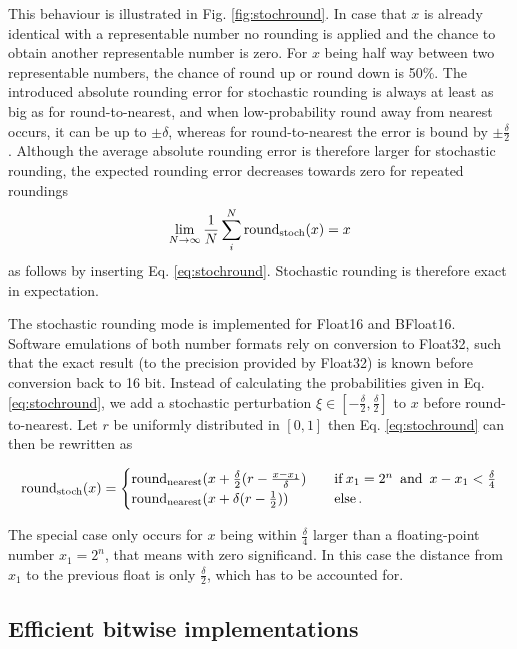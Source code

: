 This behaviour is illustrated in Fig. \ref{fig:stochround}. In case that $x$ is already identical with a representable number no rounding is applied
and the chance to obtain another representable number is zero. For $x$ being half way between two representable numbers, the chance of
round up or round down is 50\%. The introduced absolute rounding error for stochastic rounding is always at least as big as for round-to-nearest,
and when low-probability round away from nearest occurs, it can be up to $\pm \delta$, whereas for round-to-nearest the error is bound by
$\pm \tfrac{\delta}{2}$. Although the average absolute rounding error is therefore larger for stochastic rounding, the expected rounding error
decreases towards zero for repeated roundings
\begin{equation}
\lim_{N\to \infty}\frac{1}{N} \sum_i^N \operatorname{round}_{\operatorname{stoch}}(x) = x
\end{equation}
as follows by inserting Eq. \ref{eq:stochround}. Stochastic rounding is therefore exact in expectation.

The stochastic rounding mode is implemented for Float16 and BFloat16. Software emulations of both number formats rely on conversion to Float32,
such that the exact result (to the precision provided by Float32) is known before conversion back to 16 bit. Instead of calculating the probabilities
given in Eq. \ref{eq:stochround}, we add a stochastic perturbation $\xi \in [-\tfrac{\delta}{2},\tfrac{\delta}{2}]$ to $x$ before round-to-nearest.
Let $r$ be uniformly distributed in $[0,1]$ then Eq. \ref{eq:stochround} can then be rewritten as

\begin{equation}
\operatorname{round}_{\operatorname{stoch}}(x) =
\begin{cases}
\operatorname{round}_{\operatorname{nearest}}(x +\tfrac{\delta}{2}(r - \tfrac{x-x_1}{\delta}) \quad & \operatorname{if} x_1 = 2^n \operatorname{~and~} x-x_1 < \tfrac{\delta}{4}  \\
\operatorname{round}_{\operatorname{nearest}}(x + \delta(r-\tfrac{1}{2})) & \operatorname{else}.
\end{cases}
\end{equation}

The special case only occurs for $x$ being within $\tfrac{\delta}{4}$ larger than a floating-point number $x_1 = 2^n$, that means with zero significand.
In this case the distance from $x_1$ to the previous float is only $\tfrac{\delta}{2}$, which has to be accounted for.


\subsection{Efficient bitwise implementations}
\label{sec:bitwiseop}

